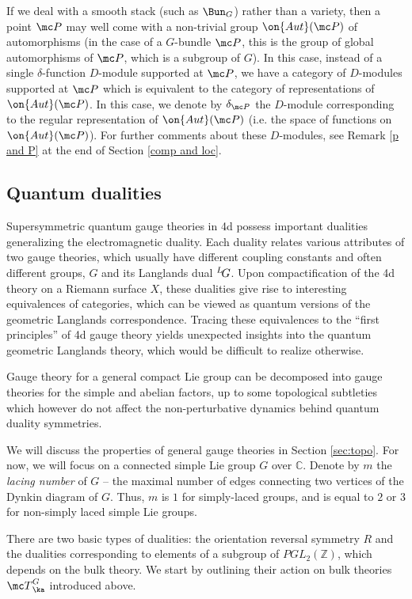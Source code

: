 \documentclass[11pt,reqno]{amsart}
\theoremstyle{plain}
\numberwithin{equation}{section}
\newcommand{\C}{\mathbb{C}}
\newcommand{\Z}{\mathbb{Z}}
\def\neg{\negthinspace}
\def\LG{{}^L\neg G}
\theoremstyle{definition}
\begin{document}
If we deal with a smooth stack (such as $\Bun_G$) rather than a
variety, then a point ${\mc P}$ may well come with a non-trivial group
$\on{Aut}({\mc P})$ of automorphisms (in the case of a $G$-bundle
${\mc P}$, this is the group of global automorphisms of ${\mc P}$,
which is a subgroup of $G$). In this case, instead of a single
$\delta$-function $D$-module supported at ${\mc P}$, we have a
category of $D$-modules supported at ${\mc P}$ which is equivalent to
the category of representations of $\on{Aut}({\mc P})$. In this case,
we denote by $\delta_{\mc P}$ the $D$-module corresponding to the
regular representation of $\on{Aut}({\mc P})$ (i.e. the space of
functions on $\on{Aut}({\mc P})$). For further comments about these
$D$-modules, see Remark \ref{p and P} at the end of Section \ref{comp
  and loc}.

\subsection{Quantum dualities}    \label{symmetries}

Supersymmetric quantum gauge theories in 4d possess important
dualities generalizing the electromagnetic duality. Each duality
relates various attributes of two gauge theories, which usually have
different coupling constants and often different groups, $G$ and its
Langlands dual $\LG$. Upon compactification of the 4d theory on a
Riemann surface $X$, these dualities give rise to interesting
equivalences of categories, which can be viewed as quantum versions of
the geometric Langlands correspondence. Tracing these equivalences to
the ``first principles'' of 4d gauge theory yields unexpected insights
into the quantum geometric Langlands theory, which would be difficult
to realize otherwise.

Gauge theory for a general compact Lie group can be decomposed into
gauge theories for the simple and abelian factors, up to some
topological subtleties which however do not affect the
non-perturbative dynamics behind quantum duality symmetries.

We will discuss the properties of general gauge theories in Section
\ref{sec:topo}. For now, we will focus on a connected simple Lie group
$G$ over $\C$. Denote by $m$ the {\em lacing number} of $G$ -- the
maximal number of edges connecting two vertices of the Dynkin diagram
of $G$.  Thus, $m$ is $1$ for simply-laced groups, and is equal to $2$
or $3$ for non-simply laced simple Lie groups.

There are two basic types of dualities: the orientation reversal
symmetry $R$ and the dualities corresponding to elements of a
subgroup of $PGL_2(\Z)$, which depends on the bulk theory. We start by
outlining their action on bulk theories ${\mc T}^G_\ka$ introduced
above.
\end{document}
